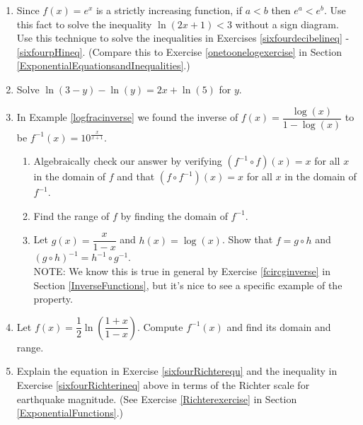 \begin{enumerate}
\setcounter{enumi}{\value{HW}}

\item \label{onetooneexpexercise} Since $f(x) = e^{x}$ is a strictly increasing function, if $a < b$ then $e^{a} < e^{b}$.  Use this fact to solve the inequality $\ln(2x + 1) < 3$ without a sign diagram. Use this technique to solve the inequalities in Exercises \ref{sixfourdecibelineq} - \ref{sixfourpHineq}. (Compare this to Exercise  \ref{onetoonelogexercise} in Section \ref{ExponentialEquationsandInequalities}.)

\item Solve $\ln(3 - y) - \ln(y) = 2x + \ln(5)$ for $y$.

\item In Example \ref{logfracinverse} we found the inverse of $f(x) = \dfrac{\log(x)}{1-\log(x)}$ to be $f^{-1}(x) = 10^{\frac{x}{x+1}}$.

\begin{enumerate}

\item Algebraically check our answer by verifying  $\left(f^{-1} \circ f\right)(x) = x$ for all $x$ in the domain of $f$ and that $\left(f \circ f^{-1}\right)(x) = x$ for all $x$ in the domain of $f^{-1}$.

\item Find the range of $f$ by finding the domain of $f^{-1}$.

\item Let $g(x) = \dfrac{x}{1 - x}$ and $h(x) = \log(x)$.  Show that $f = g \circ h$ and $(g \circ h)^{-1} = h^{-1} \circ g^{-1}$.\\


NOTE:  We know this is true in general by Exercise \ref{fcircginverse} in Section \ref{InverseFunctions}, but it's nice to see a specific example of the property.

\end{enumerate}

\item \label{inversehyptangent} Let $f(x) = \dfrac{1}{2}\ln\left(\dfrac{1 + x}{1 - x}\right)$.  Compute $f^{-1}(x)$ and find its domain and range.

\item Explain the equation in Exercise \ref{sixfourRichterequ} and the inequality in Exercise \ref{sixfourRichterineq} above in terms of the Richter scale for earthquake magnitude.  (See Exercise \ref{Richterexercise} in Section \ref{ExponentialFunctions}.)


\end{enumerate}
